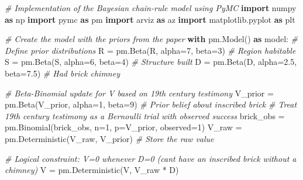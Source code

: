 \documentclass[
  11pt,
]{article}
\newenvironment{Shaded}{}{}
\newcommand{\CommentTok}[1]{\textcolor[rgb]{0.38,0.63,0.69}{\textit{#1}}}
\newcommand{\ControlFlowTok}[1]{\textcolor[rgb]{0.00,0.44,0.13}{\textbf{#1}}}
\newcommand{\DecValTok}[1]{\textcolor[rgb]{0.25,0.63,0.44}{#1}}
\newcommand{\FloatTok}[1]{\textcolor[rgb]{0.25,0.63,0.44}{#1}}
\newcommand{\ImportTok}[1]{\textcolor[rgb]{0.00,0.50,0.00}{\textbf{#1}}}
\newcommand{\NormalTok}[1]{#1}
\newcommand{\OperatorTok}[1]{\textcolor[rgb]{0.40,0.40,0.40}{#1}}
\newcommand{\StringTok}[1]{\textcolor[rgb]{0.25,0.44,0.63}{#1}}
\begin{document}
\begin{Shaded}
\begin{Highlighting}[]
\CommentTok{\# Implementation of the Bayesian chain{-}rule model using PyMC}
\ImportTok{import}\NormalTok{ numpy }\ImportTok{as}\NormalTok{ np}
\ImportTok{import}\NormalTok{ pymc }\ImportTok{as}\NormalTok{ pm}
\ImportTok{import}\NormalTok{ arviz }\ImportTok{as}\NormalTok{ az}
\ImportTok{import}\NormalTok{ matplotlib.pyplot }\ImportTok{as}\NormalTok{ plt}

\CommentTok{\# Create the model with the priors from the paper}
\ControlFlowTok{with}\NormalTok{ pm.Model() }\ImportTok{as}\NormalTok{ model:}
    \CommentTok{\# Define prior distributions}
\NormalTok{    R }\OperatorTok{=}\NormalTok{ pm.Beta(}\StringTok{\textquotesingle{}R\textquotesingle{}}\NormalTok{, alpha}\OperatorTok{=}\DecValTok{7}\NormalTok{, beta}\OperatorTok{=}\DecValTok{3}\NormalTok{)         }\CommentTok{\# Region habitable}
\NormalTok{    S }\OperatorTok{=}\NormalTok{ pm.Beta(}\StringTok{\textquotesingle{}S\textquotesingle{}}\NormalTok{, alpha}\OperatorTok{=}\DecValTok{6}\NormalTok{, beta}\OperatorTok{=}\DecValTok{4}\NormalTok{)         }\CommentTok{\# Structure built}
\NormalTok{    D }\OperatorTok{=}\NormalTok{ pm.Beta(}\StringTok{\textquotesingle{}D\textquotesingle{}}\NormalTok{, alpha}\OperatorTok{=}\FloatTok{2.5}\NormalTok{, beta}\OperatorTok{=}\FloatTok{7.5}\NormalTok{)     }\CommentTok{\# Had brick chimney}
    
    \CommentTok{\# Beta{-}Binomial update for V based on 19th century testimony}
\NormalTok{    V\_prior }\OperatorTok{=}\NormalTok{ pm.Beta(}\StringTok{\textquotesingle{}V\_prior\textquotesingle{}}\NormalTok{, alpha}\OperatorTok{=}\DecValTok{1}\NormalTok{, beta}\OperatorTok{=}\DecValTok{9}\NormalTok{)  }\CommentTok{\# Prior belief about inscribed brick}
    \CommentTok{\# Treat 19th century testimony as a Bernoulli trial with observed success}
\NormalTok{    brick\_obs }\OperatorTok{=}\NormalTok{ pm.Binomial(}\StringTok{\textquotesingle{}brick\_obs\textquotesingle{}}\NormalTok{, n}\OperatorTok{=}\DecValTok{1}\NormalTok{, p}\OperatorTok{=}\NormalTok{V\_prior, observed}\OperatorTok{=}\DecValTok{1}\NormalTok{)}
\NormalTok{    V\_raw }\OperatorTok{=}\NormalTok{ pm.Deterministic(}\StringTok{\textquotesingle{}V\_raw\textquotesingle{}}\NormalTok{, V\_prior)  }\CommentTok{\# Store the raw value}
    
    \CommentTok{\# Logical constraint: V=0 whenever D=0 (can\textquotesingle{}t have an inscribed brick without a chimney)}
\NormalTok{    V }\OperatorTok{=}\NormalTok{ pm.Deterministic(}\StringTok{\textquotesingle{}V\textquotesingle{}}\NormalTok{, V\_raw }\OperatorTok{*}\NormalTok{ D)}
    

\end{Highlighting}
\end{Shaded}
\end{document}
